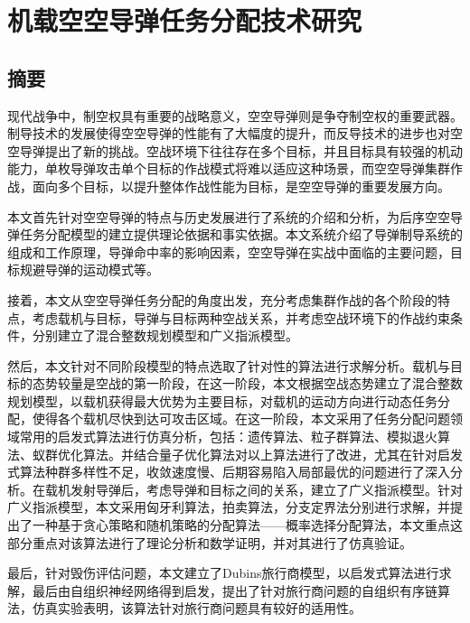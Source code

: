 \hypertarget{ux673aux8f7dux7a7aux7a7aux5bfcux5f39ux4efbux52a1ux5206ux914dux6280ux672fux7814ux7a76}{%
\section{机载空空导弹任务分配技术研究}\label{ux673aux8f7dux7a7aux7a7aux5bfcux5f39ux4efbux52a1ux5206ux914dux6280ux672fux7814ux7a76}}

\hypertarget{ux6458ux8981}{%
\subsection{摘要}\label{ux6458ux8981}}

现代战争中，制空权具有重要的战略意义，空空导弹则是争夺制空权的重要武器。制导技术的发展使得空空导弹的性能有了大幅度的提升，而反导技术的进步也对空空导弹提出了新的挑战。空战环境下往往存在多个目标，并且目标具有较强的机动能力，单枚导弹攻击单个目标的作战模式将难以适应这种场景，而空空导弹集群作战，面向多个目标，以提升整体作战性能为目标，是空空导弹的重要发展方向。

本文首先针对空空导弹的特点与历史发展进行了系统的介绍和分析，为后序空空导弹任务分配模型的建立提供理论依据和事实依据。本文系统介绍了导弹制导系统的组成和工作原理，导弹命中率的影响因素，空空导弹在实战中面临的主要问题，目标规避导弹的运动模式等。

接着，本文从空空导弹任务分配的角度出发，充分考虑集群作战的各个阶段的特点，考虑载机与目标，导弹与目标两种空战关系，并考虑空战环境下的作战约束条件，分别建立了混合整数规划模型和广义指派模型。

然后，本文针对不同阶段模型的特点选取了针对性的算法进行求解分析。载机与目标的态势较量是空战的第一阶段，在这一阶段，本文根据空战态势建立了混合整数规划模型，以载机获得最大优势为主要目标，对载机的运动方向进行动态任务分配，使得各个载机尽快到达可攻击区域。在这一阶段，本文采用了任务分配问题领域常用的启发式算法进行仿真分析，包括：遗传算法、粒子群算法、模拟退火算法、蚁群优化算法。并结合量子优化算法对以上算法进行了改进，尤其在针对启发式算法种群多样性不足，收敛速度慢、后期容易陷入局部最优的问题进行了深入分析。在载机发射导弹后，考虑导弹和目标之间的关系，建立了广义指派模型。针对广义指派模型，本文采用匈牙利算法，拍卖算法，分支定界法分别进行求解，并提出了一种基于贪心策略和随机策略的分配算法------概率选择分配算法，本文重点这部分重点对该算法进行了理论分析和数学证明，并对其进行了仿真验证。

最后，针对毁伤评估问题，本文建立了Dubins旅行商模型，以启发式算法进行求解，最后由自组织神经网络得到启发，提出了针对旅行商问题的自组织有序链算法，仿真实验表明，该算法针对旅行商问题具有较好的适用性。


